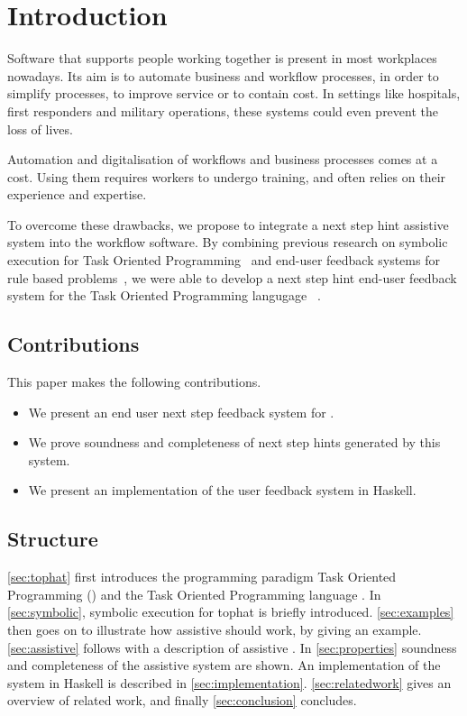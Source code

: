 
\section{Introduction}
\label{sec:intro}

Software that supports people working together is present in most workplaces nowadays.
Its aim is to automate business and workflow processes, in order to simplify processes, to improve service or to contain cost.
In settings like hospitals, first responders and military operations, these systems could even prevent the loss of lives.


Automation and digitalisation of workflows and business processes comes at a cost.
Using them requires workers to undergo training, and often relies on their experience and expertise.


To overcome these drawbacks, we propose to integrate a next step hint assistive system into the workflow software.
By combining previous research on symbolic execution for Task Oriented Programming~\cite{Naus2019} and end-user feedback systems for rule based problems~\cite{DBLP:conf/sfp/NausJ16},
we were able to develop a next step hint end-user feedback system for the Task Oriented Programming langugage \TOPHAT~\cite{Steenvoorden2019}.




\subsection{Contributions}

This paper makes the following contributions.

\begin{itemize}
  \item We present an end user next step feedback system for \TOPHAT.
  \item We prove soundness and completeness of next step hints generated by this system.
  \item We present an implementation of the user feedback system in Haskell.
\end{itemize}

\subsection{Structure}

\cref{sec:tophat} first introduces the programming paradigm Task Oriented Programming (\TOP) and the Task Oriented Programming language \TOPHAT.
In \cref{sec:symbolic}, symbolic execution for tophat is briefly introduced.
\cref{sec:examples} then goes on to illustrate how assistive \TOPHAT should work, by giving an example.
\cref{sec:assistive} follows with a description of assistive \TOPHAT.
In \cref{sec:properties} soundness and completeness of the assistive system are shown.
An implementation of the system in Haskell is described in \cref{sec:implementation}.
\cref{sec:relatedwork} gives an overview of related work, and finally \cref{sec:conclusion} concludes.
